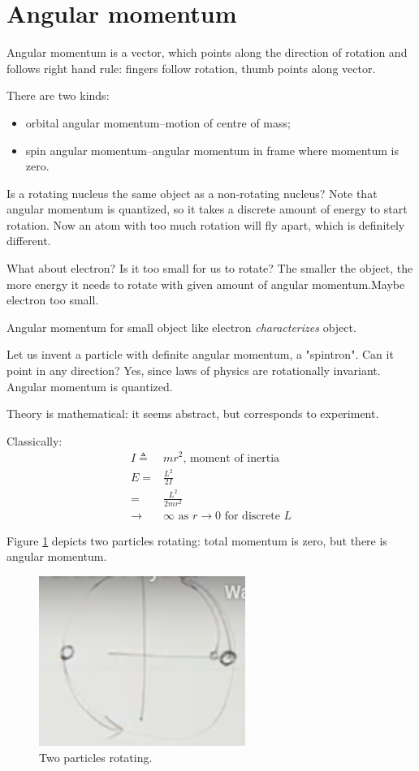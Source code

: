 \documentclass[]{article}
\begin{document}
\section{Angular momentum}

Angular momentum is a vector, which points along the direction of rotation and follows right hand rule: fingers follow rotation, thumb points along vector.

There are two kinds:
\begin{itemize}
	\item orbital angular momentum--motion of centre of mass;
	\item spin angular momentum--angular momentum in frame where momentum is zero.
\end{itemize}

Is a rotating nucleus the same object as a non-rotating nucleus? Note that angular momentum is quantized, so it takes a discrete amount of energy to start rotation. Now an atom with too much rotation will fly apart, which is definitely different. 

What about electron? Is it too small for us to rotate? The smaller the object, the more energy it needs to rotate with given amount of angular momentum.Maybe electron too small.

Angular momentum for small object like electron \emph{characterizes} object.

Let us invent a particle with definite angular momentum, a "spintron". Can it point in any direction? Yes, since laws of physics are rotationally invariant. Angular momentum is quantized.

Theory is mathematical: it seems abstract, but corresponds to experiment.

Classically:
\begin{align*}
I\triangleq&mr^2 \text{, moment of inertia}\\
E=&\frac{L^2}{2I}\\
=&\frac{L^2}{2mr^2}\\
\rightarrow &\infty \text{ as } r \rightarrow 0 \text{ for discrete $L$}
\end{align*}

Figure \ref{fig:two:particles:rotating} depicts two particles rotating: total momentum is zero, but there is angular momentum.
\begin{figure}[H]
	\caption{Two particles rotating.}\label{fig:two:particles:rotating}
	\includegraphics[width=0.6\textwidth]{two-particles-rotating}
\end{figure}
\end{document}
